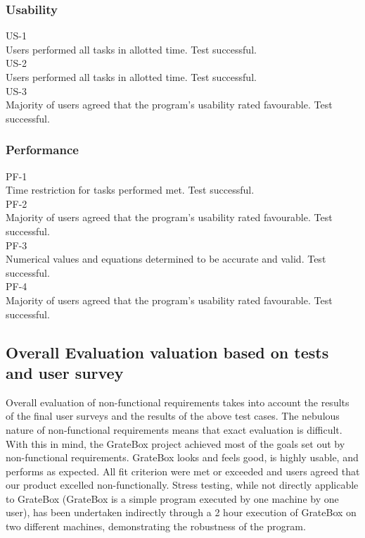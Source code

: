 \documentclass[12pt, titlepage]{article}
\begin{document}
\subsubsection{Usability}

US-1\\

Users performed all tasks in allotted time. Test successful.\\

US-2\\

Users performed all tasks in allotted time. Test successful.\\

US-3\\

Majority of users agreed that the program's usability rated favourable. Test successful.

\subsubsection{Performance}

PF-1\\

Time restriction for tasks performed met. Test successful.\\

PF-2\\

Majority of users agreed that the program's usability rated favourable. Test successful.\\

PF-3\\

Numerical values and equations determined to be accurate and valid. Test successful.\\

PF-4\\

Majority of users agreed that the program's usability rated favourable. Test successful.

\subsection{Overall Evaluation valuation based on tests and user survey}

Overall evaluation of non-functional requirements takes into account the results of the final user surveys and the results of the above test cases. The nebulous nature of non-functional requirements means that exact evaluation is difficult. With this in mind, the GrateBox project achieved most of the goals set out by non-functional requirements. GrateBox looks and feels good, is highly usable, and performs as expected. All fit criterion were met or exceeded and users agreed that our product excelled non-functionally. Stress testing, while not directly applicable to GrateBox (GrateBox is a simple program executed by one machine by one user), has been undertaken indirectly through a 2 hour execution of GrateBox on two different machines, demonstrating the robustness of the program.
\end{document}

